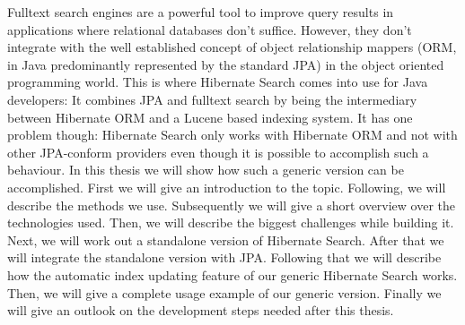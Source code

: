 Fulltext search engines are a powerful tool to improve query results in applications where relational databases don't suffice. However, they don't integrate with the well established concept of object relationship mappers (ORM, in Java predominantly represented by the standard JPA) in the object oriented programming world. This is where Hibernate Search comes into use for Java developers: It combines JPA and fulltext search by being the intermediary between Hibernate ORM and a Lucene based indexing system. It has one problem though: Hibernate Search only works with Hibernate ORM and not with other JPA-conform providers even though it is possible to accomplish such a behaviour. In this thesis we will show how such a generic version can be accomplished. First we will give an introduction to the topic. Following, we will describe the methods we use. Subsequently we will give a short overview over the technologies used. Then, we will describe the biggest challenges while building it. Next, we will work out a standalone version of Hibernate Search. After that we will integrate the standalone version with JPA. Following that we will describe how the automatic index updating feature of our generic Hibernate Search works. Then, we will give a complete usage example of our generic version. Finally we will give an outlook on the development steps needed after this thesis.
